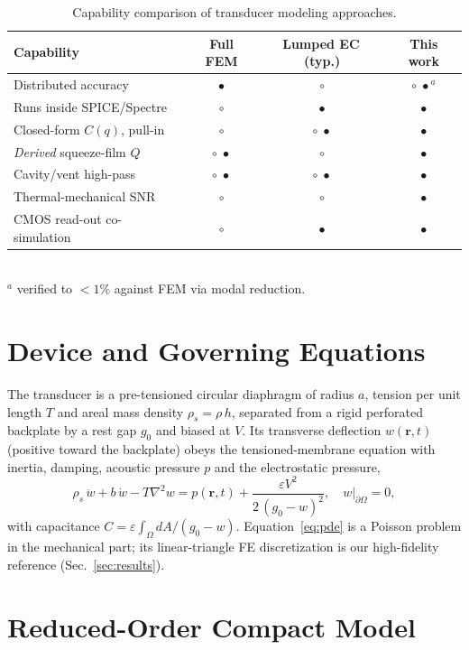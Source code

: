 \documentclass[conference]{IEEEtran}
\newcommand{\yes}{$\bullet$}
\newcommand{\prt}{$\circ\!\!\!\!\;\bullet$}
\newcommand{\no}{$\circ$}
\begin{document}
\begin{table}[t]
\caption{Capability comparison of transducer modeling approaches.}
\label{tab:cap}
\centering
\begin{tabular}{lccc}
\toprule
Capability & Full FEM & Lumped EC\,(typ.) & \textbf{This work} \\
\midrule
Distributed accuracy            & \yes & \no  & \prt$^{a}$ \\
Runs inside SPICE/Spectre       & \no  & \yes & \yes \\
Closed-form $C(q)$, pull-in     & \no  & \prt & \yes \\
\emph{Derived} squeeze-film $Q$ & \prt & \no  & \yes \\
Cavity/vent high-pass           & \prt & \prt & \yes \\
Thermal-mechanical SNR          & \no  & \no  & \yes \\
CMOS read-out co-simulation     & \no  & \yes & \yes \\
\bottomrule
\end{tabular}
\\[2pt]
{\footnotesize $^{a}$ verified to $<1\%$ against FEM via modal reduction.}
\end{table}

\section{Device and Governing Equations}
The transducer is a pre-tensioned circular diaphragm of radius $a$, tension per
unit length $T$ and areal mass density $\rho_s=\rho\,h$, separated from a rigid
perforated backplate by a rest gap $g_0$ and biased at $V$. Its transverse
deflection $w(\mathbf{r},t)$ (positive toward the backplate) obeys the
tensioned-membrane equation with inertia, damping, acoustic pressure $p$ and the
electrostatic pressure,
\begin{equation}
\rho_s\,\ddot w + b\,\dot w - T\nabla^2 w
   = p(\mathbf{r},t) + \frac{\varepsilon V^2}{2\,(g_0-w)^2},
\quad w|_{\partial\Omega}=0,
\label{eq:pde}
\end{equation}
with capacitance $C=\varepsilon\!\int_\Omega dA/(g_0-w)$. Equation~\eqref{eq:pde}
is a Poisson problem in the mechanical part; its linear-triangle FE
discretization is our high-fidelity reference (Sec.~\ref{sec:results}).

\section{Reduced-Order Compact Model}
\end{document}
